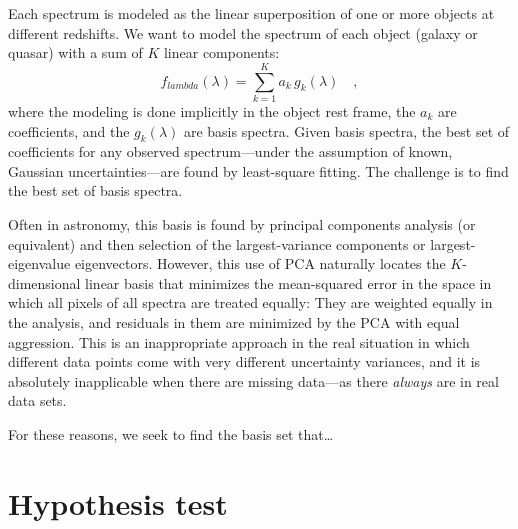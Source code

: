 \documentclass[12pt]{article}
\begin{document}
Each spectrum is modeled as the linear superposition of one or more
objects at different redshifts.  We want to model the spectrum of each
object (galaxy or quasar) with a sum of $K$ linear components:
\begin{equation}
f_{lambda}(\lambda) = \sum_{k=1}^{K} a_k\,g_k(\lambda)
\quad ,
\end{equation}
where the modeling is done implicitly in the object rest frame, the
$a_k$ are coefficients, and the $g_k(\lambda)$ are basis spectra.
Given basis spectra, the best set of coefficients for any observed
spectrum---under the assumption of known, Gaussian uncertainties---are
found by least-square fitting.  The challenge is to find the
best set of basis spectra.

Often in astronomy, this basis is found by principal components
analysis (or equivalent) and then selection of the largest-variance
components or largest-eigenvalue eigenvectors.  However, this use of
PCA naturally locates the $K$-dimensional linear basis that minimizes
the mean-squared error in the space in which all pixels of all spectra
are treated equally: They are weighted equally in the analysis, and
residuals in them are minimized by the PCA with equal aggression.
This is an inappropriate approach in the real situation in which
different data points come with very different uncertainty variances,
and it is absolutely inapplicable when there are missing data---as
there \emph{always} are in real data sets.

For these reasons, we seek to find the basis set that\ldots

\section{Hypothesis test}
\end{document}
